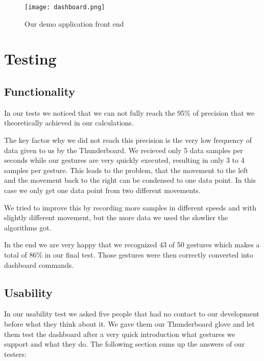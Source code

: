 \begin{figure}[htp]
\begin{center}
  \texttt{[image: dashboard.png]}
\caption{Our demo application front end}
\end{center}
\end{figure} 


\chapter{Testing}
\label{ch:Tests}

\section{Functionality}
\label{ch:Results:sec:Functionality}

In our tests we noticed that we can not fully reach the 95\% of precision that we theoretically achieved in our calculations.

The key factor why we did not reach this precision is the very low frequency of data given to us by the Thunderboard.
We recieved only 5 data samples per seconds while our gestures are very quickly executed, resulting in only 3 to 4 samples per gesture.
This leads to the problem, that the movement to the left and the movement back to the right can be condensed to one data point.
In this case we only get one data point from two different movements.

We tried to improve this by recording more samples in different speeds and with slightly different movement, but the more data we used the slowlier the algorithms got.

In the end we are very happy that we recognized 43 of 50 gestures which makes a total of 86\% in our final test.
Those gestures were then correctly converted into dashboard commands.

\section{Usability}
\label{ch:Results:sec:Usability}

In our usability test we asked five people that had no contact to our development before what they think about it.
We gave them our Thunderboard glove and let them test the dashboard after a very quick introduction what gestures we support and what they do.
The following section sums up the answers of our testers:

